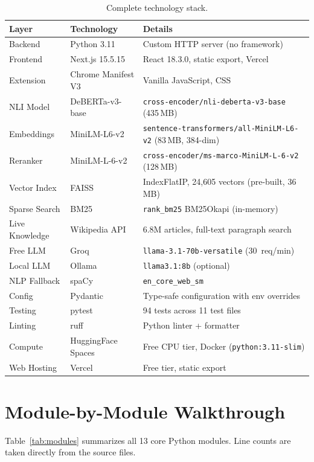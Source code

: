 \documentclass[12pt, a4paper, oneside]{report}
\newcommand{\deberta}{DeBERTa-v3}
\newcommand{\minilm}{MiniLM-L6-v2}
\begin{document}
\begin{table}[H]
\centering
\caption{Complete technology stack.}
\label{tab:techstack}
\small
\begin{tabularx}{\textwidth}{l l X}
\toprule
\textbf{Layer} & \textbf{Technology} & \textbf{Details} \\
\midrule
Backend & Python 3.11 & Custom HTTP server (no framework) \\
Frontend & Next.js 15.5.15 & React 18.3.0, static export, Vercel \\
Extension & Chrome Manifest V3 & Vanilla JavaScript, CSS \\
NLI Model & \deberta{}-base & \texttt{cross-encoder/nli-deberta-v3-base} (435\,MB) \\
Embeddings & \minilm{} & \texttt{sentence-transformers/all-MiniLM-L6-v2} (83\,MB, 384-dim) \\
Reranker & MiniLM-L-6-v2 & \texttt{cross-encoder/ms-marco-MiniLM-L-6-v2} (128\,MB) \\
Vector Index & FAISS & IndexFlatIP, 24{,}605 vectors (pre-built, 36\,MB) \\
Sparse Search & BM25 & \texttt{rank\_bm25} BM25Okapi (in-memory) \\
Live Knowledge & Wikipedia API & 6.8M articles, full-text paragraph search \\
Free LLM & Groq & \texttt{llama-3.1-70b-versatile} (30~req/min) \\
Local LLM & Ollama & \texttt{llama3.1:8b} (optional) \\
NLP Fallback & spaCy & \texttt{en\_core\_web\_sm} \\
Config & Pydantic & Type-safe configuration with env overrides \\
Testing & pytest & 94 tests across 11 test files \\
Linting & ruff & Python linter + formatter \\
Compute & HuggingFace Spaces & Free CPU tier, Docker (\texttt{python:3.11-slim}) \\
Web Hosting & Vercel & Free tier, static export \\
\bottomrule
\end{tabularx}
\end{table}

\section{Module-by-Module Walkthrough}

Table~\ref{tab:modules} summarizes all 13 core Python modules. Line counts are taken directly from the source files.
\end{document}
